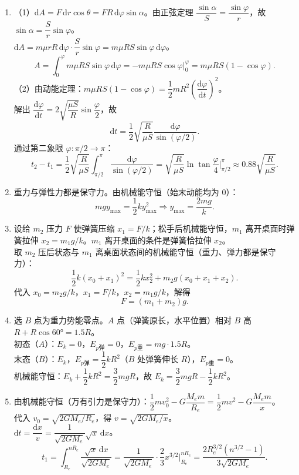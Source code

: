 \documentclass[12pt]{article}
\begin{document}
\begin{enumerate}[label=\textbf{例\arabic*.}, leftmargin=*]
\item（1）$\mathrm{d}A = F\,\mathrm{d}r\cos\theta = F R\,\mathrm{d}\varphi\sin\alpha$。由正弦定理 $\dfrac{\sin\alpha}{S} = \dfrac{\sin\varphi}{r}$，故 $\sin\alpha = \dfrac{S}{r}\sin\varphi$。\\
$\mathrm{d}A = m\mu r R\,\mathrm{d}\varphi\cdot\dfrac{S}{r}\sin\varphi = m\mu R S\sin\varphi\,\mathrm{d}\varphi$。
\[
  A = \int_0^\varphi m\mu R S\sin\varphi\,\mathrm{d}\varphi = -m\mu R S\cos\varphi\Big|_0^\varphi = m\mu R S(1 - \cos\varphi).
\]
（2）由动能定理：$m\mu R S(1 - \cos\varphi) = \dfrac{1}{2}m R^2\left(\dfrac{\mathrm{d}\varphi}{\mathrm{d}t}\right)^2$。\\
解出 $\dfrac{\mathrm{d}\varphi}{\mathrm{d}t} = 2\sqrt{\dfrac{\mu S}{R}}\sin\dfrac{\varphi}{2}$，故
\[
  \mathrm{d}t = \frac{1}{2}\sqrt{\frac{R}{\mu S}}\frac{\mathrm{d}\varphi}{\sin(\varphi/2)}.
\]
通过第二象限 $\varphi: \pi/2 \to \pi$：
\[
  t_2 - t_1 = \frac{1}{2}\sqrt{\frac{R}{\mu S}}\int_{\pi/2}^\pi \frac{\mathrm{d}\varphi}{\sin(\varphi/2)} = \sqrt{\frac{R}{\mu S}}\ln\tan\frac{\varphi}{4}\Big|_{\pi/2}^\pi \approx 0.88\sqrt{\frac{R}{\mu S}}.
\]

\item 重力与弹性力都是保守力。由机械能守恒（始末动能均为 0）：
\[
  mgy_{\max} = \frac{1}{2}ky_{\max}^2 \Rightarrow y_{\max} = \frac{2mg}{k}.
\]

\item 设给 $m_2$ 压力 $F$ 使弹簧压缩 $x_1 = F/k$；松手后机械能守恒，$m_1$ 离开桌面时弹簧拉伸 $x_2 = m_1 g/k$。$m_1$ 离开桌面的条件是弹簧恰拉伸 $x_2$。\\
取 $m_2$ 压后状态与 $m_1$ 离桌面状态间的机械能守恒（重力、弹力都是保守力）：
\[
  \frac{1}{2}k(x_0 + x_1)^2 = \frac{1}{2}kx_2^2 + m_2 g(x_0 + x_1 + x_2).
\]
代入 $x_0 = m_2 g/k$，$x_1 = F/k$，$x_2 = m_1 g/k$，解得
\[
  F = (m_1 + m_2)g.
\]

\item 选 $B$ 点为重力势能零点。$A$ 点（弹簧原长，水平位置）相对 $B$ 高 $R + R\cos 60° = 1.5R$。\\
初态（$A$）：$E_k = 0$，$E_{p弹} = 0$，$E_{p重} = mg\cdot 1.5R$。\\
末态（$B$）：$E_k$，$E_{p弹} = \dfrac{1}{2}kR^2$（$B$ 处弹簧伸长 $R$），$E_{p重} = 0$。\\
机械能守恒：$E_k + \dfrac{1}{2}kR^2 = \dfrac{3}{2}mgR$，故 $E_k = \dfrac{3}{2}mgR - \dfrac{1}{2}kR^2$。

\item 由机械能守恒（万有引力是保守力）：$\dfrac{1}{2}mv_0^2 - G\dfrac{M_e m}{R_e} = \dfrac{1}{2}mv^2 - G\dfrac{M_e m}{x}$。\\
代入 $v_0 = \sqrt{2GM_e/R_e}$，得 $v = \sqrt{2GM_e/x}$。\\
$\mathrm{d}t = \dfrac{\mathrm{d}x}{v} = \dfrac{1}{\sqrt{2GM_e}}\sqrt{x}\,\mathrm{d}x$。
\[
  t_1 = \int_{R_e}^{nR_e}\frac{\sqrt{x}\,\mathrm{d}x}{\sqrt{2GM_e}} = \frac{1}{\sqrt{2GM_e}}\cdot\frac{2}{3}x^{3/2}\Big|_{R_e}^{nR_e} = \frac{2R_e^{3/2}(n^{3/2}-1)}{3\sqrt{2GM_e}}.
\]

\end{enumerate}
\end{document}
